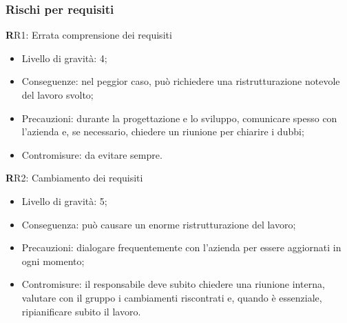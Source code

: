 \subsubsection{Rischi per requisiti}
\textbf RR1: 
Errata comprensione dei requisiti
\begin{itemize}
\item Livello di gravità: 4;
\item Conseguenze: nel peggior caso, può richiedere una ristrutturazione notevole del lavoro svolto;
\item Precauzioni: durante la progettazione e lo sviluppo, comunicare spesso con l’azienda e, se necessario, chiedere un riunione per chiarire i dubbi;
\item Contromisure: da evitare sempre.
\end{itemize}
\textbf RR2:
Cambiamento dei requisiti
\begin{itemize}
\item Livello di gravità: 5;
\item Conseguenza: può causare un enorme ristrutturazione del lavoro;
\item Precauzioni: dialogare frequentemente con l'azienda per essere aggiornati in ogni momento;
\item Contromisure: il responsabile deve subito chiedere una riunione interna, valutare con il gruppo i cambiamenti riscontrati e, quando è essenziale, ripianificare subito il lavoro.
\end{itemize}



